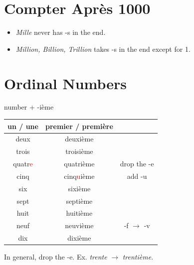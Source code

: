 \documentclass{book}
\begin{document}
    \section{Compter Après 1000}
        \begin{itemize}
            \item \textit{Mille} never has -s in the end.
            \item \textit{Million, Billion, Trillion} takes -s in the end except for 1.
        \end{itemize}
    
    \section{Ordinal Numbers}
        \begin{center}
            number + -ième \\
            \begin{tabular}{|c|c|c|}
                \hline
                un / une & premier / première & \\
                \hline
                deux & deuxième & \\
                \hline
                trois & troisième & \\
                \hline
                quatr\textcolor{red}{e} & quatrième & drop the -e \\
                \hline
                cinq & cinq\textcolor{red}{u}ième & add -u \\
                \hline
                six & sixième & \\
                \hline
                sept & septième & \\
                \hline
                huit & huitième & \\
                \hline
                neuf & neuvième & -f $\to$ -v \\
                \hline
                dix & dixième & \\
                \hline
            \end{tabular}
        \end{center}
        In general, drop the -e. Ex. \textit{trente} $\to$ \textit{trentième}.
\end{document}
